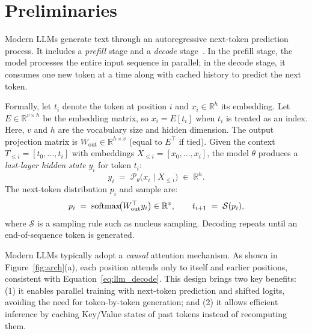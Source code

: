 \section{Preliminaries}
\label{sec:preliminary}

Modern LLMs generate text through an autoregressive next-token prediction process.
It includes a \emph{prefill} stage and a \emph{decode} stage~\citep{radford2018gpt1,radford2019gpt2,kwon2023vllm}.
In the prefill stage, the model processes the entire input sequence in parallel; in the decode stage, it consumes one new token at a time along with cached history to predict the next token.

Formally, let $t_i$ denote the token at position $i$ and $x_i\in\mathbb{R}^h$ its embedding. 
Let $E\in\mathbb{R}^{v\times h}$ be the embedding matrix, so $x_i=E[t_i]$ when $t_i$ is treated as an index. 
Here, $v$ and $h$ are the vocabulary size and hidden dimension. 
The output projection matrix is $W_{\text{out}}\in\mathbb{R}^{h\times v}$ (equal to $E^\top$ if tied). 
Given the context $T_{\le i}=[t_0,\dots,t_i]$ with embeddings $X_{\le i}=[x_0,\dots,x_i]$, the model $\theta$ produces a \emph{last-layer hidden state} $y_i$ for token $t_i$:
\begin{equation}
    y_i \;=\; \mathcal{P}_{\theta}\!\big(x_i \mid X_{\le i}\big)\;\in\;\mathbb{R}^h .
    \label{eq:llm_decode}
\end{equation}
The next-token distribution $p_i$ and sample are:
\begin{equation}
    p_i \;=\; \mathrm{softmax}\!\big(W_{\text{out}}^\top y_i\big) \in \mathbb{R}^v,
    \qquad
    t_{i+1} \;=\; \mathcal{S}(p_i),
    \label{eq:llm_sample}
\end{equation}
where $\mathcal{S}$ is a sampling rule such as nucleus sampling. 
Decoding repeats until an end-of-sequence token is generated.

Modern LLMs typically adopt a \emph{causal} attention mechanism.
As shown in Figure~\ref{fig:arch}(a), each position attends only to itself and earlier positions, consistent with Equation~\ref{eq:llm_decode}. 
This design brings two key benefits: 
(1) it enables parallel training with next-token prediction and shifted logits, avoiding the need for token-by-token generation; 
and (2) it allows efficient inference by caching Key/Value states of past tokens instead of recomputing them.

